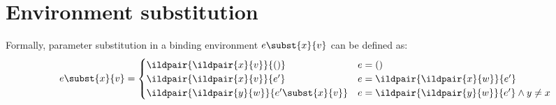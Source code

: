 \section{Environment substitution}
\label{env-substitution}

Formally, parameter substitution in a binding environment $e\subst{x}{v}$ can be defined as:
\begin{equation}
  e \subst{x}{v} =
  \begin{cases}
    \ildpair{\ildpair{x}{v}}{()} & e = () \\
    \ildpair{\ildpair{x}{v}}{e'} & e = \ildpair{\ildpair{x}{w}}{e'} \\
    \ildpair{\ildpair{y}{w}}{e' \subst{x}{v}} & e = \ildpair{\ildpair{y}{w}}{e'} \land y \neq x
  \end{cases}
\end{equation}
